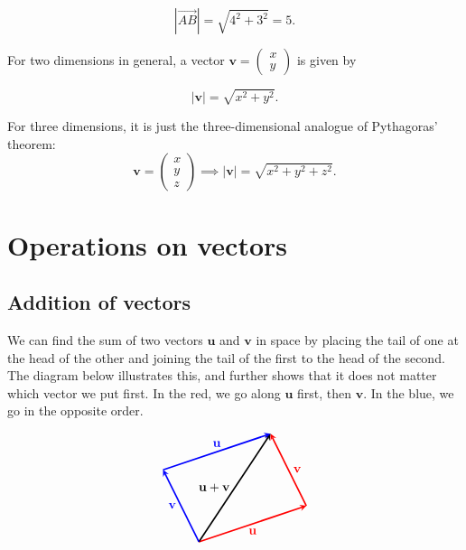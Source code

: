 \documentclass[a4paper,12pt]{amsart}
\begin{document}
    \[ \left| \vec{AB} \right| = \sqrt{4^2 + 3^2} = 5. \]

    For two dimensions in general, a vector $\textbf{v} = \begin{pmatrix} x \\ y \end{pmatrix}$ is given by

    \[ \left| \mathbf{v} \right| = \sqrt{x^2 + y^2}. \]

    For three dimensions, it is just the three-dimensional analogue of Pythagoras' theorem:
    \[ \mathbf{v} = \begin{pmatrix} x \\ y \\ z \end{pmatrix} \implies \left| \mathbf{v} \right| = \sqrt{x^2 + y^2 + z^2}. \]

    \section{Operations on vectors}
    
    \subsection{Addition of vectors}

    We can find the sum of two vectors $\mathbf{u}$ and $\mathbf{v}$ in space by placing the tail of one at the head of the other and joining the tail of the first to the head of the second. The diagram below illustrates this, and further shows that it does not matter which vector we put first. In the red, we go along $\mathbf{u}$ first, then $\mathbf{v}$.  In the blue, we go in the opposite order.

    \[
        \begin{tikzpicture}[vector/.style={-stealth,very thick}]
            \coordinate (A) at (0,0);
            \coordinate (B) at (3,1);
            \coordinate (C) at (2,3);
            \coordinate (D) at (-1,2);
            \draw[vector, red] (A) -- (B) node[midway, below] {$\mathbf{u}$}; 
            \draw[vector, red] (B) -- (C) node[midway, right] {$\mathbf{v}$};
            \draw[vector] (A) -- (C) node[midway, left] {$\mathbf{u} + \mathbf{v}$};
            \draw[vector, blue] (A) -- (D) node[midway, left] {$\mathbf{v}$};
            \draw[vector, blue] (D) -- (C) node[midway, above] {$\mathbf{u}$};
        \end{tikzpicture}
    \]
\end{document}
